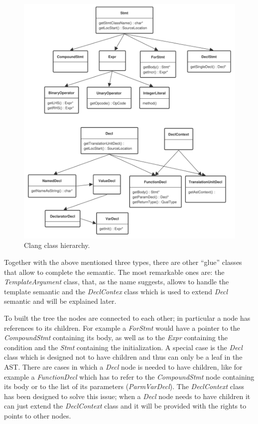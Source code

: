\documentclass[a4paper,12pt,oneside]{book}
\begin{document}
\begin{figure}[H]
\centering
\includegraphics[scale=0.6]{clang_classes.pdf}
\caption{Clang class hierarchy.}
\end{figure}

Together with the above mentioned three types, there are other “glue” classes that allow to complete the semantic. The most remarkable ones are: the \emph{TemplateArgument} class, that, as the name suggests, allows to handle the template semantic and the \emph{DeclContex} class which is used to extend \emph{Decl} semantic and will be explained later. 

To built the tree the nodes are connected to each other; in particular a node has references to its children. For example a \emph{ForStmt} would have a pointer to the \emph{CompoundStmt} containing its body, as well as to the \emph{Expr} containing the condition and the \emph{Stmt} containing the initialization. A special case is the \emph{Decl} class which is designed not to have children and thus can only be a leaf in the AST. There are cases in which a \emph{Decl} node is needed to have children, like for example a \emph{FunctionDecl} which has to refer to the \emph{CompoundStmt} node containing its body or to the list of its parameters (\emph{ParmVarDecl}). The \emph{DeclContext} class has been designed to solve this issue; when a \emph{Decl} node needs to have children it can just extend the \emph{DeclContext} class and it will be provided with the rights to points to other nodes. 
\end{document}
